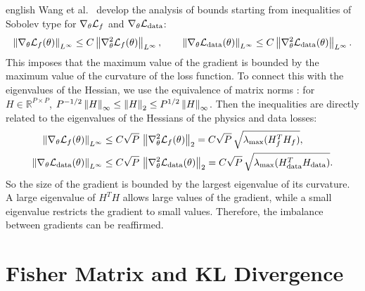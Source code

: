 \documentclass[../0000.tex]{subfiles}
\begin{document}
\begin{hyphenrules}{english}
Wang et al.~\cite{wang2021gradient} develop the analysis of bounds starting from inequalities of Sobolev type
for $\nabla_\theta\mathcal{L}_f$ and $\nabla_\theta\mathcal{L}_{\mathrm{data}}$:
\begin{equation}
  \left\lVert \nabla_\theta\mathcal{L}_f(\theta) \right\rVert_{L^\infty}\le C\left\lVert \nabla^2_\theta\mathcal{L}_f(\theta) \right\rVert_{L^\infty},\qquad
  \left\lVert \nabla_\theta\mathcal{L}_{\mathrm{data}}(\theta) \right\rVert_{L^\infty}\le C\left\lVert \nabla^2_\theta\mathcal{L}_{\mathrm{data}}(\theta) \right\rVert_{L^\infty}.
  \label{eq:grad-bounds}
\end{equation}
This imposes that the maximum value of the gradient is bounded by the maximum value of the curvature of
the loss function. To connect this with the eigenvalues of the Hessian, we use the equivalence of matrix
norms \cite{trefethen1997}: for $H\in\mathbb{R}^{P\times P}$,
$P^{-1/2}\left\lVert H \right\rVert_\infty\le\left\lVert H \right\rVert_2\le P^{1/2}\left\lVert H \right\rVert_\infty$. Then the inequalities are directly related
to the eigenvalues of the Hessians of the physics and data losses:
\begin{align}
  \left\lVert \nabla_\theta\mathcal{L}_f(\theta) \right\rVert_{L^\infty}&\le C\sqrt{P}\,\left\lVert \nabla^2_\theta\mathcal{L}_f(\theta) \right\rVert_{2}
  =C\sqrt{P}\,\sqrt{\lambda_{\max}(H_f^{T}H_f)}, \label{eq:bound-f}\\
  \left\lVert \nabla_\theta\mathcal{L}_{\mathrm{data}}(\theta) \right\rVert_{L^\infty}&\le C\sqrt{P}\,\left\lVert \nabla^2_\theta\mathcal{L}_{\mathrm{data}}(\theta) \right\rVert_{2}
  =C\sqrt{P}\,\sqrt{\lambda_{\max}(H_{\mathrm{data}}^{T}H_{\mathrm{data}})}. \label{eq:bound-data}
\end{align}
So the size of the gradient is bounded by the largest eigenvalue of its curvature. A large eigenvalue of
$H^{T}H$ allows large values of the gradient, while a small eigenvalue restricts the gradient to small
values. Therefore, the imbalance between gradients can be reaffirmed.


\section{Fisher Matrix and KL Divergence}\label{app:fisher}


\end{hyphenrules}
\end{document}
